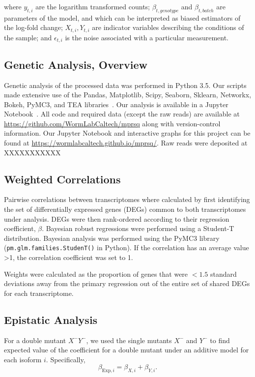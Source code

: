\documentclass[9pt,twocolumn,twoside]{pnas-new}
\begin{document}
{where $y_{t, i}$ are the logarithm transformed counts; $\beta_{t, genotype}$ and
$\beta_{t, batch}$ are parameters of the model, and which can be interpreted as
biased estimators of the log-fold change; $X_{t, i}, Y_{t, i}$ are indicator
variables describing the conditions of the sample; and $\epsilon_{t, i}$ is the
noise associated with a particular measurement.

\subsection*{Genetic Analysis, Overview}
Genetic analysis of the processed data was performed in Python 3.5. Our scripts
made extensive use of the Pandas, Matplotlib, Scipy, Seaborn, Sklearn, Networkx,
Bokeh, PyMC3, and TEA libraries~\cite{Team2014,McKinney2011,Oliphant2007,
Pedregosa2012,Salvatier2015,VanDerWalt2011,Hunter2007,Angeles-Albores2016,Waskom}.
Our analysis is available in a Jupyter Notebook~\cite{Perez2007}. All code and
required data (except the raw reads) are available at
\url{https://github.com/WormLabCaltech/mprsq} along with version-control
information. Our Jupyter Notebook and interactive graphs for this project can be
found at \url{https://wormlabcaltech.github.io/mprsq/}. Raw reads were deposited
at XXXXXXXXXXX


\subsection*{Weighted Correlations}
Pairwise correlations between transcriptomes where calculated by first identifying
the set of differentially expressed genes (DEGs) common to both transcriptomes under
analysis. DEGs were then rank-ordered according to their regression coefficient,
$\beta$. Bayesian robust regressions were performed using a Student-T distribution.
Bayesian analysis was performed using the PyMC3 library~\cite{Salvatier2015}
(\texttt{pm.glm.families.StudenT()} in Python). If the correlation has an average
value >1, the correlation coefficient was set to 1.

Weights were calculated as the proportion of genes that were $<1.5$ standard deviations
away from the primary regression out of the entire set of shared DEGs for each
transcriptome.

\subsection*{Epistatic Analysis}
For a double mutant $X^-Y^-$, we used the single mutants $X^-$ and $Y^-$ to
find expected value of the coefficient for a double mutant under an additive model
for each isoform $i$.
Specifically,
\begin{equation}
  \beta_{\mathrm{Exp},i} = \beta_{X,i} + \beta_{Y,i}.
\end{equation}

}
\end{document}
